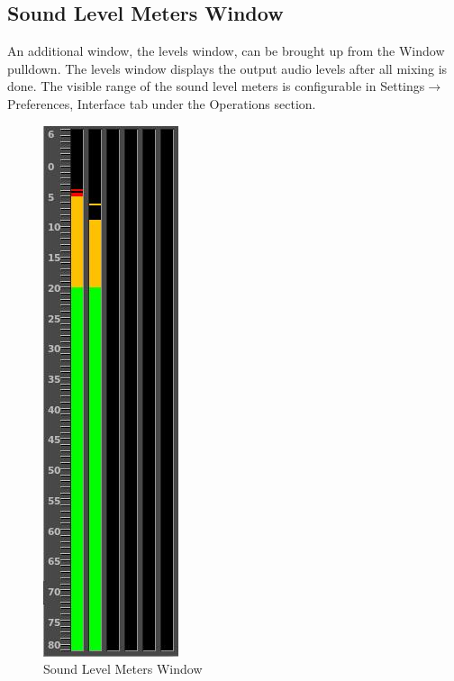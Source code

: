 \subsection{Sound Level Meters Window}%
\label{sub:sound_level_meters_window}

An additional window, the levels window, can be brought up from the Window pulldown.  
The levels window displays the output audio levels after all mixing is done.  
The visible range of the sound level meters is configurable in Settings$\rightarrow$Preferences, Interface tab under the Operations section.

\begin{figure} 
    \centering
    \vspace{-4ex}
    \includegraphics[width=0.5\linewidth]{images/volume_meter.png}
    \caption{Sound Level Meters Window}
    \label{fig:volume_meter}
\end{figure}

